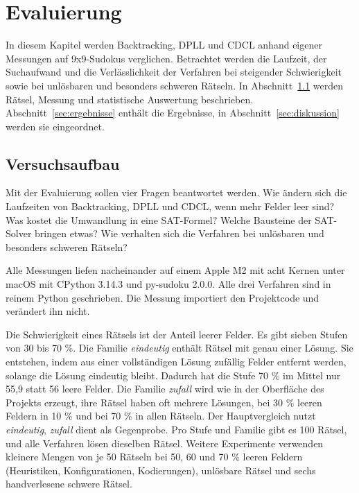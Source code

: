 \providecommand{\plotdir}{images/}

\section{Evaluierung}\label{sec:evaluation}

In diesem Kapitel werden Backtracking, DPLL und CDCL anhand eigener Messungen auf 9x9-Sudokus verglichen. Betrachtet werden die Laufzeit, der Suchaufwand und die Verlässlichkeit der Verfahren bei steigender Schwierigkeit sowie bei unlösbaren und besonders schweren Rätseln. In Abschnitt~\ref{sec:versuchsaufbau} werden Rätsel, Messung und statistische Auswertung beschrieben. Abschnitt~\ref{sec:ergebnisse} enthält die Ergebnisse, in Abschnitt~\ref{sec:diskussion} werden sie eingeordnet.

\subsection{Versuchsaufbau}\label{sec:versuchsaufbau}
Mit der Evaluierung sollen vier Fragen beantwortet werden. Wie ändern sich die Laufzeiten von Backtracking, DPLL und CDCL, wenn mehr Felder leer sind? Was kostet die Umwandlung in eine SAT-Formel? Welche Bausteine der SAT-Solver bringen etwas? Wie verhalten sich die Verfahren bei unlösbaren und besonders schweren Rätseln?

Alle Messungen liefen nacheinander auf einem Apple M2 mit acht Kernen unter macOS mit CPython 3.14.3 und py-sudoku 2.0.0. Alle drei Verfahren sind in reinem Python geschrieben. Die Messung importiert den Projektcode und verändert ihn nicht.

Die Schwierigkeit eines Rätsels ist der Anteil leerer Felder. Es gibt sieben Stufen von 30 bis 70 \%. Die Familie \emph{eindeutig} enthält Rätsel mit genau einer Lösung. Sie entstehen, indem aus einer vollständigen Lösung zufällig Felder entfernt werden, solange die Lösung eindeutig bleibt. Dadurch hat die Stufe 70 \% im Mittel nur 55,9 statt 56 leere Felder. Die Familie \emph{zufall} wird wie in der Oberfläche des Projekts erzeugt, ihre Rätsel haben oft mehrere Lösungen, bei 30 \% leeren Feldern in 10 \% und bei 70 \% in allen Rätseln. Der Hauptvergleich nutzt \emph{eindeutig}, \emph{zufall} dient als Gegenprobe. Pro Stufe und Familie gibt es 100 Rätsel, und alle Verfahren lösen dieselben Rätsel. Weitere Experimente verwenden kleinere Mengen von je 50 Rätseln bei 50, 60 und 70 \% leeren Feldern (Heuristiken, Konfigurationen, Kodierungen), unlösbare Rätsel und sechs handverlesene schwere Rätsel.

